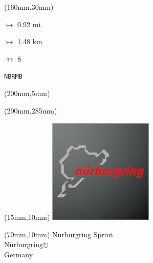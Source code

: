 \begin{textblock*}{40mm}(160mm,30mm)%
\Large
\par$\mapsto$ 0.92 mi.
\par$\mapsto$ 1.48 km
\par$\looparrowright$ 8
\par\hfill\tiny\tt NBRMB\\
\end{textblock*}
\begin{textblock*}{20mm}(200mm,5mm)%
\fbox{\thepage}
\label{NBRMB}
\end{textblock*}
\begin{textblock*}{20mm}(200mm,285mm)%
\fbox{\thepage}
\end{textblock*}

\null\newpage
\begin{textblock*}{50mm}(15mm,10mm)%
\includegraphics[width=50mm]{LG/2015-05-20_00089.png}
\end{textblock*}
\begin{textblock*}{130mm}(70mm,10mm)%
{\fontsize{20}{20}\selectfont Nürburgring Sprint\\}
{\fontsize{16}{16}\selectfont Nürburgring\hfill \Large$\circlearrowright$\\}
{\fontsize{12}{12}\selectfont Germany\\}
\end{textblock*}
